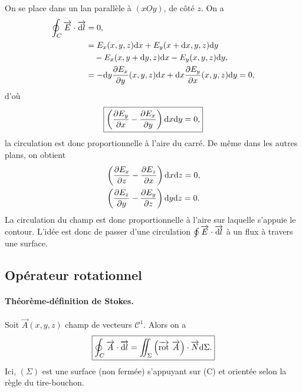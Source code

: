         On se place dans un lan parallèle à $(xOy)$, de côté $z$. On a 
        \begin{align}
            \oint_{C}\protect\overrightarrow{{E}}\cdot\protect\overrightarrow{{\mathrm{d} l}}
            &=0,\\
            &=
            E_x(x,y,z)\mathrm{d} x+E_y(x+\mathrm{d} x,y,z)\mathrm{d} y\\
            &\quad-E_x(x,y+\mathrm{d} y,z)\mathrm{d} x-E_y(x,y,z)\mathrm{d} y,\\
            &=
            -\mathrm{d} y\frac{\partial E_x}{\partial y}(x,y,z)\mathrm{d} x+\mathrm{d} x\frac{\partial E_y}{\partial x}(x,y,z)\mathrm{d} y=0,
        \end{align}
        d'où
        \begin{equation}
            \boxed{
            \left(\frac{\partial E_y}{\partial x}-\frac{\partial E_x}{\partial y}\right)\mathrm{d} x\mathrm{d} y=0,}
        \end{equation}
        la circulation est donc proportionnelle à l'aire du carré. De même dans les autres plans, on obtient
        \begin{equation}
            \begin{aligned}
                &\left(\frac{\partial E_x}{\partial z}-\frac{\partial E_z}{\partial x}\right)\mathrm{d} x\mathrm{d} z=0,\\
                &\left(\frac{\partial E_z}{\partial y}-\frac{\partial E_y}{\partial z}\right)\mathrm{d} y\mathrm{d} z=0.
            \end{aligned}
        \end{equation}
        La circulation du champ est donc proportionnelle à l'aire sur laquelle s'appuie le contour. L'idée est donc de passer d'une circulation $\oint\protect\overrightarrow{{E}}\cdot\protect\overrightarrow{{\mathrm{d} l}}$ à un flux à travers une surface.

    \subsection{Opérateur rotationnel}

        \paragraph{Théorème-définition de Stokes.}

            Soit $\vec{A}(x,y,z)$ champ de vecteurs $\mathcal{C}^{1}$. Alors on a 
            \begin{equation}
                \boxed{
                    \oint_{C}\protect\overrightarrow{{A}}\cdot\protect\overrightarrow{{\mathrm{d} l}}=\iint_{\Sigma}\left(\protect\overrightarrow{{\mathrm{rot}}}~\protect\overrightarrow{{A}}\right)\cdot\protect\overrightarrow{{N}}\mathrm{d}\Sigma.
                }
            \end{equation}
            Ici, $(\Sigma)$ est une surface (non fermée) s'appuyant sur (C) et orientée selon la règle du tire-bouchon.

